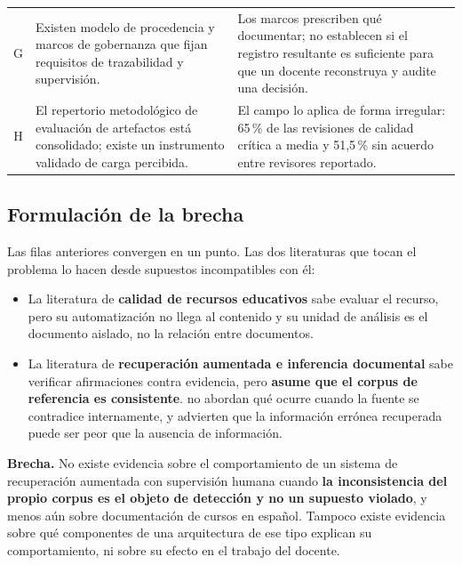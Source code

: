 \begin{xltabular}{\textwidth}{@{}c L{5.1cm} X@{}}
G &
Existen modelo de procedencia y marcos de gobernanza que fijan requisitos de
trazabilidad y supervisión. &
Los marcos prescriben qué documentar; no establecen si el registro resultante es
suficiente para que un docente reconstruya y audite una decisión. \\

H &
El repertorio metodológico de evaluación de artefactos está consolidado; existe un
instrumento validado de carga percibida. &
El campo lo aplica de forma irregular: 65\,\% de las revisiones de calidad crítica a
media y 51,5\,\% sin acuerdo entre revisores reportado. \\
\end{xltabular}

\subsection{Formulación de la brecha}
\label{sec:brecha-formulacion}

Las filas anteriores convergen en un punto. Las dos literaturas que tocan el problema
lo hacen desde supuestos incompatibles con él:

\begin{itemize}
  \item La literatura de \textbf{calidad de recursos educativos} sabe evaluar el
        recurso, pero su automatización no llega al contenido y su unidad de análisis
        es el documento aislado, no la relación entre documentos.
  \item La literatura de \textbf{recuperación aumentada e inferencia documental} sabe
        verificar afirmaciones contra evidencia, pero \textbf{asume que el corpus de
        referencia es consistente}. \textcite{lewis2020retrieval} no abordan qué
        ocurre cuando la fuente se contradice internamente, y
        \textcite{gao2024retrieval} advierten que la información errónea recuperada
        puede ser peor que la ausencia de información.
\end{itemize}

\begin{estado}[colframe=ecAzul]
\small
\textbf{Brecha.} No existe evidencia sobre el comportamiento de un sistema de
recuperación aumentada con supervisión humana cuando \textbf{la inconsistencia del
propio corpus es el objeto de detección y no un supuesto violado}, y menos aún sobre
documentación de cursos en español. Tampoco existe evidencia sobre qué componentes de
una arquitectura de ese tipo explican su comportamiento, ni sobre su efecto en el
trabajo del docente.
\end{estado}

